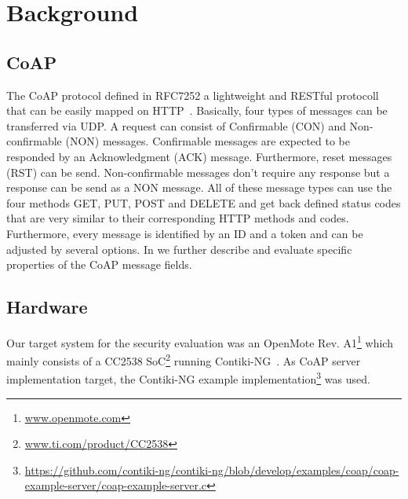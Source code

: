 \section{Background}
\label{section:background}


\subsection{CoAP}

The CoAP protocol defined in RFC7252 a lightweight and RESTful protocoll that can be easily mapped on HTTP~\cite{RFC7252}. Basically, four types of messages can be transferred via UDP. A request can consist of Confirmable (CON) and Non-confirmable (NON) messages. Confirmable messages are expected to be responded by an Acknowledgment (ACK) message. Furthermore, reset messages (RST) can be send. Non-confirmable messages don't require any response but a response can be send as a NON message. All of these message types can use the four methods GET, PUT, POST and DELETE and get back defined status codes that are very similar to their corresponding HTTP methods and codes. Furthermore, every message is identified by an ID and a token and can be adjusted by several options. In  we further describe and evaluate specific properties of the CoAP message fields.

\subsection{Hardware}

Our target system for the security evaluation was an OpenMote Rev. A1\footnote{\url{www.openmote.com}} which mainly consists of a CC2538 SoC\footnote{\url{www.ti.com/product/CC2538}} running Contiki-NG~\cite{contiki}. As CoAP server implementation target, the Contiki-NG example implementation\footnote{\url{https://github.com/contiki-ng/contiki-ng/blob/develop/examples/coap/coap-example-server/coap-example-server.c}} was used.

